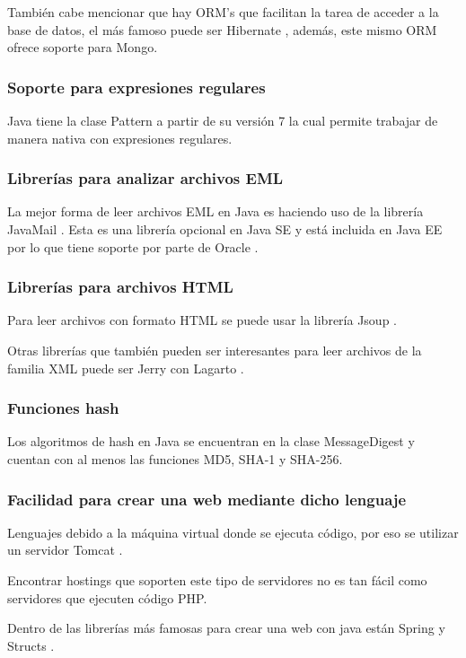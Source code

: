 También cabe mencionar que hay ORM’s que facilitan la tarea de acceder a la base de datos, el más famoso puede ser Hibernate \cite{Hibernate}, además, este mismo ORM ofrece soporte para Mongo. 

\subsubsection{Soporte para expresiones regulares}
Java tiene la clase Pattern \cite{java_Pattern_class} a partir de su versión 7 la cual permite trabajar de manera nativa con expresiones regulares. 

\subsubsection{Librerías para analizar archivos EML}
La mejor forma de leer archivos EML en Java es haciendo uso de la librería JavaMail \cite{JavaMail}. Esta es una librería opcional en Java SE y está incluida en Java EE por lo que tiene soporte por parte de Oracle \cite{java_JavaMail}.

\subsubsection{Librerías para archivos HTML}
Para leer archivos con formato HTML se puede usar la librería Jsoup \cite{jsoup}.

Otras librerías que también pueden ser interesantes para leer archivos de la familia XML puede ser Jerry \cite{jerry} con Lagarto \cite{jerry}.

\subsubsection{Funciones hash}
Los algoritmos de hash en Java se encuentran en la clase MessageDigest \cite{java_MessageDigest} y cuentan con al menos las funciones MD5, SHA-1 y SHA-256.

\subsubsection{Facilidad para crear una web mediante dicho lenguaje}
Lenguajes debido a la máquina virtual donde se ejecuta código, por eso se utilizar un servidor Tomcat \cite{tomcat}.

Encontrar hostings que soporten este tipo de servidores no es tan fácil como servidores que ejecuten código PHP.

Dentro de las librerías más famosas para crear una web con java están Spring \cite{Spring} y Structs \cite{Struts}. 

